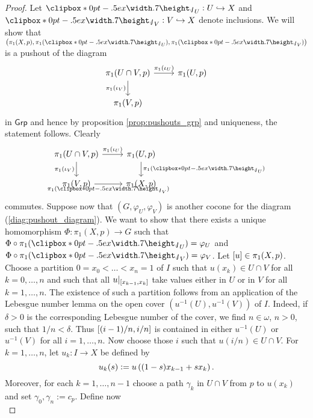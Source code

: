 \begin{proof}
	Let $\jota_U : U \hookrightarrow X$ and $\jota_V : V \hookrightarrow X$ denote inclusions. We will show that $\del[1]{\pi_1(X,p), \pi_1(\jota_U),\pi_1(\jota_V)}$ is a pushout of the diagram
	\begin{equation}
		\begin{tikzcd}
			\pi_1(U \cap V,p) \arrow[r,"\pi_1(\iota_U)"]\arrow[d,"\pi_1(\iota_V)"'] & \pi_1(U,p)\\
			\pi_1(V,p)
		\end{tikzcd}
		\label{diag:pushout_diagram}
	\end{equation}
	\noindent in $\mathsf{Grp}$ and hence by proposition \ref{prop:pushouts_grp} and uniqueness, the statement follows. Clearly
	\begin{equation*}
		\begin{tikzcd}
			\pi_1(U \cap V,p) \arrow[r,"\pi_1(\iota_U)"]\arrow[d,"\pi_1(\iota_V)"'] & \pi_1(U,p)\arrow[d,"\pi_1(\jota_U)"]\\
			\pi_1(V,p) \arrow[r,"\pi_1(\jota_V)"'] & \pi_1(X,p)
		\end{tikzcd}
	\end{equation*}
	\noindent commutes. Suppose now that $(G,\varphi_U,\varphi_V)$ is another cocone for the diagram (\ref{diag:pushout_diagram}). We want to show that there exists a unique homomorphism $\Phi : \pi_1(X,p) \to G$ such that $\Phi \circ \pi_1(\jota_U) = \varphi_U$ and $\Phi \circ \pi_1(\jota_V) = \varphi_V$. Let $\sbr{u} \in \pi_1(X,p)$. Choose a partition $0 = x_0 < \dots < x_n = 1$ of $I$ such that $u(x_k) \in U \cap V$ for all $k = 0,\dots,n$ and such that all $u\vert_{\sbr[0]{x_{k - 1},x_k}}$ take values either in $U$ or in $V$ for all $k = 1,\dots, n$. The existence of such a partition follows from an application of the Lebesgue number lemma on the open cover $(u^{-1}(U),u^{-1}(V))$ of $I$. Indeed, if $\delta > 0$ is the corresponding Lebesgue number of the cover, we find $n \in \omega$, $n > 0$, such that $1/n < \delta$. Thus $\intcc[0]{(i-1)/n,
	i/n}$ is contained in either $u^{-1}(U)$ or $u^{-1}(V)$ for all $i = 1,\dots,n$. Now choose those $i$ such that $u(i/n) \in U \cap V$. For $k = 1,\dots,n$, let $u_k : I \to X$ be defined by
	\begin{equation*}
		u_k(s) := u\del[0]{(1 - s)x_{k - 1} + sx_k}.
	\end{equation*}
	Moreover, for each $k = 1,\dots,n-1$ choose a path $\gamma_k$ in $U \cap V$ from $p$ to $u(x_k)$ and set $\gamma_0, \gamma_n := c_p$. Define now
	\begin{equation}

\end{equation}
\end{proof}
